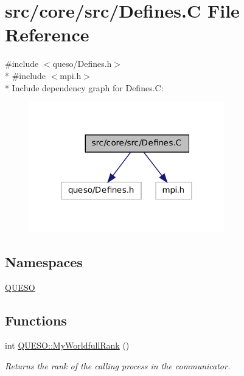 \hypertarget{_defines_8_c}{\section{src/core/src/\-Defines.C File Reference}
\label{_defines_8_c}
}
{\ttfamily \#include $<$queso/\-Defines.\-h$>$}\\*
{\ttfamily \#include $<$mpi.\-h$>$}\\*
Include dependency graph for Defines.\-C\-:
\nopagebreak
\begin{figure}[H]
\begin{center}
\leavevmode
\includegraphics[width=240pt]{_defines_8_c__incl}
\end{center}
\end{figure}
\subsection*{Namespaces}
\begin{DoxyCompactItemize}
\item 
\hyperlink{namespace_q_u_e_s_o}{Q\-U\-E\-S\-O}
\end{DoxyCompactItemize}
\subsection*{Functions}
\begin{DoxyCompactItemize}
\item 
int \hyperlink{namespace_q_u_e_s_o_a5af97e1f9320b7787efc744ef76be297}{Q\-U\-E\-S\-O\-::\-My\-Worldfull\-Rank} ()
\begin{DoxyCompactList}\small\item\em Returns the rank of the calling process in the communicator. \end{DoxyCompactList}\end{DoxyCompactItemize}

